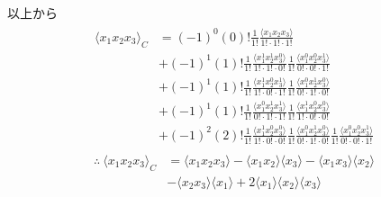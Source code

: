 \documentclass[uplatex,a4j,11pt,dvipdfmx]{jsarticle}
\begin{document}
以上から
\begin{align}
  \begin{split}
    \langle x_1x_2x_3\rangle_C&=(-1)^0(0)!\frac{1}{1!}\frac{\langle x_1x_2x_3\rangle}{1!\cdot1!\cdot1!}\\
    &+(-1)^1(1)!\frac{1}{1!}\frac{\langle x_1^1x_2^1x_3^0\rangle}{1!\cdot1!\cdot0!}\frac{1}{1!}\frac{\langle x_1^0x_2^0x_3^1\rangle}{0!\cdot0!\cdot1!}\\
    &+(-1)^1(1)!\frac{1}{1!}\frac{\langle x_1^1x_2^0x_3^1\rangle}{1!\cdot0!\cdot1!}\frac{1}{1!}\frac{\langle x_1^0x_2^1x_3^0\rangle}{0!\cdot1!\cdot0!}\\
    &+(-1)^1(1)!\frac{1}{1!}\frac{\langle x_1^0x_2^1x_3^1\rangle}{0!\cdot1!\cdot1!}\frac{1}{1!}\frac{\langle x_1^1x_2^0x_3^0\rangle}{1!\cdot0!\cdot0!}\\
    &+(-1)^2(2)!\frac{1}{1!}\frac{\langle x_1^1x_2^0x_3^0\rangle}{1!\cdot0!\cdot0!}
    \frac{1}{1!}\frac{\langle x_1^0x_2^1x_3^0\rangle}{0!\cdot1!\cdot0!}
    \frac{1}{1!}\frac{\langle x_1^0x_2^0x_3^1\rangle}{0!\cdot0!\cdot1!}
  \end{split}
\end{align}
\begin{align}
  \begin{split}
    \therefore\ \langle x_1x_2x_3\rangle_C&=\langle x_1x_2x_3\rangle-\langle x_1x_2\rangle\langle x_3\rangle-\langle x_1x_3\rangle\langle x_2\rangle\\
    &-\langle x_2x_3\rangle\langle x_1\rangle+2\langle x_1\rangle\langle x_2\rangle\langle x_3\rangle
  \end{split}
\end{align}
\end{document}
